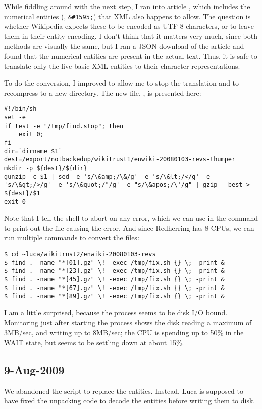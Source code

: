 While fiddling around with the next step, I ran into
article , which includes the numerical
entities (\eg, \texttt{\&\#1595;}) that XML also happens to allow.
The question is whether Wikipedia expects these to be
encoded as UTF-8 characters, or to leave them in their
entity encoding.
I don't think that it matters very much, since both methods
are visually the same, but I ran a JSON download of the
 article and found that the numerical entities
are present in the actual text.
Thus, it is safe to translate only the five basic XML entities
to their character representations.

To do the conversion, I improved  to allow
me to stop the translation and to recompress to a new directory.
The new file, , is presented here:
\begin{verbatim}
#!/bin/sh
set -e
if test -e "/tmp/find.stop"; then
    exit 0;
fi
dir=`dirname $1`
dest=/export/notbackedup/wikitrust1/enwiki-20080103-revs-thumper
mkdir -p ${dest}/${dir}
gunzip -c $1 | sed -e 's/\&amp;/\&/g' -e 's/\&lt;/</g' -e 's/\&gt;/>/g' -e 's/\&quot;/"/g' -e "s/\&apos;/\'/g" | gzip --best > ${dest}/$1
exit 0
\end{verbatim}
Note that I tell the shell to abort on any error, which we
can use in the  command to print out the file
causing the error.
And since Redherring has 8 CPUs, we can run multiple 
commands to convert the files:
\begin{verbatim}
$ cd ~luca/wikitrust2/enwiki-20080103-revs
$ find . -name "*[01].gz" \! -exec /tmp/fix.sh {} \; -print &
$ find . -name "*[23].gz" \! -exec /tmp/fix.sh {} \; -print &
$ find . -name "*[45].gz" \! -exec /tmp/fix.sh {} \; -print &
$ find . -name "*[67].gz" \! -exec /tmp/fix.sh {} \; -print &
$ find . -name "*[89].gz" \! -exec /tmp/fix.sh {} \; -print &
\end{verbatim}

I am a little surprised, because the process seems to be
disk I/O bound.
Monitoring just after starting the process shows the
disk reading a maximum of 3MB/sec, and writing up to 8MB/sec;
the CPU is spending up to 50\% in the WAIT state, but seems to be
settling down at about 15\%.

\subsection{9-Aug-2009}

We abandoned the  script to replace the entities.
Instead, Luca is supposed to have fixed the unpacking code to
decode the entities before writing them to disk.


